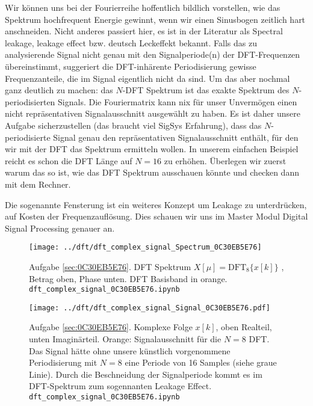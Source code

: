 \begin{Loesung}
%
Wir können uns bei der Fourierreihe hoffentlich bildlich vorstellen, wie das
Spektrum hochfrequent Energie gewinnt, wenn wir einen Sinusbogen zeitlich
hart anschneiden.
%
Nicht anderes passiert hier, es ist in der Literatur als Spectral leakage,
leakage effect bzw. deutsch Leckeffekt bekannt.
%
Falls das zu analysierende Signal nicht genau mit den Signalperiode(n)
der DFT-Frequenzen übereinstimmt, suggeriert die DFT-inhärente Periodisierung
gewisse Frequenzanteile, die im Signal eigentlich nicht da sind.
%
Um das aber nochmal ganz deutlich zu machen: das $N$-DFT Spektrum ist das exakte
Spektrum des $N$-periodisierten Signals.
Die Fouriermatrix kann nix für unser Unvermögen einen nicht repräsentativen
Signalausschnitt ausgewählt zu haben.
%
Es ist daher unsere Aufgabe sicherzustellen (das braucht viel SigSys Erfahrung),
dass das $N$-periodisierte Signal genau den repräsentativen Signalausschnitt
enthält, für den wir mit der DFT das Spektrum ermitteln wollen.
%
In unserem einfachen Beispiel reicht es schon die DFT Länge auf $N=16$ zu erhöhen.
%
Überlegen wir zuerst warum das so ist, wie das DFT Spektrum ausschauen könnte
und checken dann mit dem Rechner.
%

Die sogenannte Fensterung ist ein weiteres Konzept um Leakage zu unterdrücken,
auf Kosten der Frequenzauflösung. Dies schauen wir uns im Master Modul
Digital Signal Processing genauer an.
%
\end{Loesung}

\begin{figure}
\centering
\texttt{[image: ../dft/dft\_complex\_signal\_Spectrum\_0C30EB5E76]}
\caption{Aufgabe \ref{sec:0C30EB5E76}. DFT Spektrum $X[\mu]=\mathrm{DFT}_8\{x[k]\}$ ,
Betrag oben, Phase unten. DFT Basisband in orange.
\texttt{dft\_complex\_signal\_0C30EB5E76.ipynb}}
\label{fig:dft_complex_signal_Spectrum_0C30EB5E76}
\end{figure}
%
\begin{figure}
\centering
\texttt{[image: ../dft/dft\_complex\_signal\_Signal\_0C30EB5E76.pdf]}
\caption{Aufgabe \ref{sec:0C30EB5E76}. Komplexe Folge $x[k]$, oben Realteil,
unten Imaginärteil. Orange: Signalausschnitt für die $N=8$ DFT. Das Signal
hätte ohne unsere künstlich vorgenommene Periodisierung mit $N=8$
eine Periode von 16 Samples (siehe graue Linie). Durch die Beschneidung der
Signalperiode kommt es im DFT-Spektrum
 zum sogennanten Leakage Effect.
\texttt{dft\_complex\_signal\_0C30EB5E76.ipynb}}
\label{fig:dft_complex_signal_Signal_0C30EB5E76}
\end{figure}







